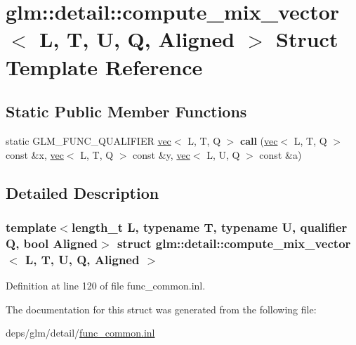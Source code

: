 \hypertarget{structglm_1_1detail_1_1compute__mix__vector}{}\section{glm\+:\+:detail\+:\+:compute\+\_\+mix\+\_\+vector$<$ L, T, U, Q, Aligned $>$ Struct Template Reference}
\label{structglm_1_1detail_1_1compute__mix__vector}
\subsection*{Static Public Member Functions}
\begin{DoxyCompactItemize}
\item 
\mbox{\label{structglm_1_1detail_1_1compute__mix__vector_ac5a0714c7ca8bc2143989e9f8db6b633}} 
static G\+L\+M\+\_\+\+F\+U\+N\+C\+\_\+\+Q\+U\+A\+L\+I\+F\+I\+ER \hyperlink{structglm_1_1vec}{vec}$<$ L, T, Q $>$ {\bfseries call} (\hyperlink{structglm_1_1vec}{vec}$<$ L, T, Q $>$ const \&x, \hyperlink{structglm_1_1vec}{vec}$<$ L, T, Q $>$ const \&y, \hyperlink{structglm_1_1vec}{vec}$<$ L, U, Q $>$ const \&a)
\end{DoxyCompactItemize}


\subsection{Detailed Description}
\subsubsection*{template$<$length\+\_\+t L, typename T, typename U, qualifier Q, bool Aligned$>$\newline
struct glm\+::detail\+::compute\+\_\+mix\+\_\+vector$<$ L, T, U, Q, Aligned $>$}



Definition at line 120 of file func\+\_\+common.\+inl.



The documentation for this struct was generated from the following file\+:\begin{DoxyCompactItemize}
\item 
deps/glm/detail/\hyperlink{func__common_8inl}{func\+\_\+common.\+inl}\end{DoxyCompactItemize}
